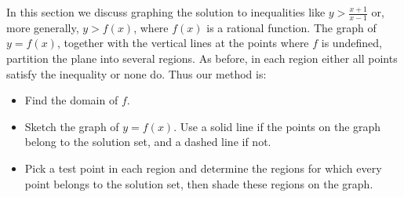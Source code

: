 \documentclass[11pt]{book}               %
\begin{document}
In this section we discuss graphing the solution to inequalities like $y > \frac{x+1}{x-1}$ or, more generally, $y > f(x)$, where $f(x)$ is a rational function.
The graph of $y = f(x)$, together with the vertical lines at the points where $f$ is undefined, partition the plane into several regions.  As before, in each region either all points satisfy the inequality or none do.  Thus our method is:
\begin{itemize}
\item Find the domain of $f$.
\item Sketch the graph of $y = f(x)$.  Use a solid line if the points on the graph belong to the solution set, and a dashed line if not.
\item Pick a test point in each region and determine the regions for which every point belongs to the solution set, then shade these regions on the graph.
\end{itemize}
\end{document}
